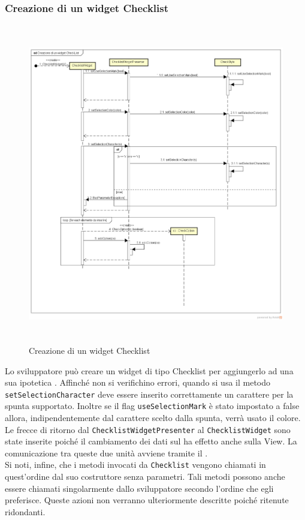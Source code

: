\newpage

\subsubsection{Creazione di un widget Checklist}

\label{Creazione di un widget Checklist}
\begin{figure}[H]
	\centering
	\includegraphics[width=16cm, height=14cm]{Sezioni/Diagrammi/SDK/Creazione di un widget CheckList.png}
	\caption{Creazione di un widget Checklist}
\end{figure}

Lo sviluppatore può creare un widget di tipo Checklist per aggiungerlo ad una sua ipotetica . Affinché non si verifichino errori, quando si usa il metodo \texttt{setSelectionCharacter} deve essere inserito correttamente un carattere per la spunta supportato. Inoltre se il flag \texttt{useSelectionMark} è stato impostato a false allora, indipendentemente dal carattere scelto dalla spunta, verrà usato il colore.\\
Le frecce di ritorno dal \texttt{ChecklistWidgetPresenter}  al \texttt{ChecklistWidget} sono state inserite poiché il cambiamento dei dati sul  ha effetto anche sulla View. La comunicazione tra queste due unità avviene tramite il  . \\
Si noti, infine, che i metodi invocati da \texttt{Checklist} vengono chiamati in quest'ordine dal suo costruttore senza parametri. Tali metodi possono anche essere chiamati singolarmente dallo sviluppatore secondo l'ordine che egli preferisce. Queste azioni non verranno ulteriormente descritte poiché ritenute ridondanti.

